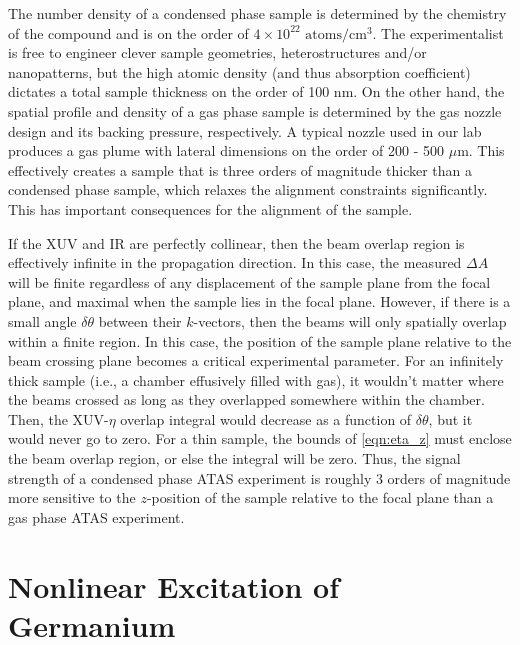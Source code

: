 The number density of a condensed phase sample is determined by the chemistry of the compound and is on the order of $4 \times 10^{22} \text{ atoms}/\text{cm}^3$. The experimentalist is free to engineer clever sample geometries, heterostructures and/or nanopatterns, but the high atomic density (and thus absorption coefficient) dictates a total sample thickness on the order of 100 nm. On the other hand, the spatial profile and density of a gas phase sample is determined by the gas nozzle design and its backing pressure, respectively. A typical nozzle used in our lab produces a gas plume with lateral dimensions on the order of 200 - 500 $\mu$m. This effectively creates a sample that is three orders of magnitude thicker than a condensed phase sample, which relaxes the alignment constraints significantly. This has important consequences for the alignment of the sample.

If the XUV and IR are perfectly collinear, then the beam overlap region is effectively infinite in the propagation direction. In this case, the measured $\Delta A$ will be finite regardless of any displacement of the sample plane from the focal plane, and maximal when the sample lies in the focal plane. However, if there is a small angle $\delta \theta$ between their $k$-vectors, then the beams will only spatially overlap within a finite region. In this case, the position of the sample plane relative to the beam crossing plane becomes a critical experimental parameter. For an infinitely thick sample (i.e., a chamber effusively filled with gas), it wouldn't matter where the beams crossed as long as they overlapped somewhere within the chamber. Then, the XUV-$\eta$ overlap integral would decrease as a function of $\delta \theta$, but it would never go to zero. For a thin sample, the bounds of \cref{eqn:eta_z} must enclose the beam overlap region, or else the integral will be zero. Thus, the signal strength of a condensed phase ATAS experiment is roughly 3 orders of magnitude more sensitive to the $z$-position of the sample relative to the focal plane than a gas phase ATAS experiment.


\section{Nonlinear Excitation of Germanium}
\label{sec:nonlinear_excitation_germanium}

